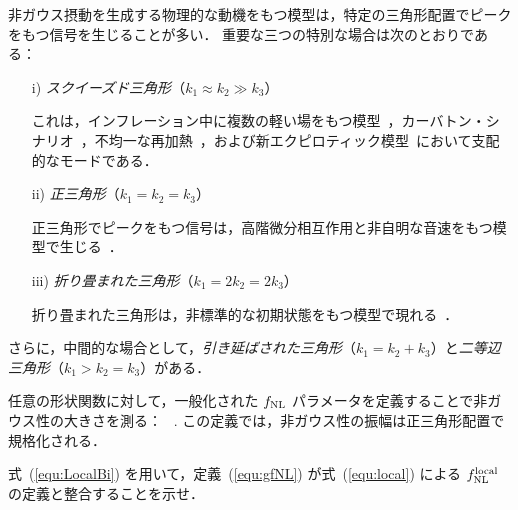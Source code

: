 非ガウス摂動を生成する物理的な動機をもつ模型は，特定の三角形配置でピークをもつ信号を生じることが多い．
重要な三つの特別な場合は次のとおりである：
\begin{enumerate}
\item[i)] {\it スクイーズド三角形}（$k_1 \approx k_2 \gg k_3$）

これは，インフレーション中に複数の軽い場をもつ模型~\cite{BMRmulti, Bernardeau:2002jy, Bernardeau:2002jf, Sasaki:2008uc, Naruko:2008sq, Byrnes:2008wi, Byrnes:2006fr, Langlois:2008vk, Valiviita:2008zb, Assadullahi:2007uw, Valiviita:2006mz, Vernizzi:2006ve, Allen:2005ye}，カーバトン・シナリオ~\cite{Linde:1996gt, Lyth_etal03}，不均一な再加熱~\cite{Dvali:2003em, Kofman:2003nx}，および新エクピロティック模型~\cite{Creminelli:2007aq,Koyama_etal07,Buchbinder_etal07, Lehners:2007wc,Lehners:2008my, Koyama:2007ag, Koyama:2007mg}において支配的なモードである．

\item[ii)] {\it 正三角形}（$k_1 = k_2 = k_3$）

正三角形でピークをもつ信号は，高階微分相互作用と非自明な音速をもつ模型で生じる~\cite{DBI, Chen:2006nt}．

\item[iii)] {\it 折り畳まれた三角形}（$k_1 = 2k_2 = 2 k_3$）

折り畳まれた三角形は，非標準的な初期状態をもつ模型で現れる~\cite{Holman:2007na, Chen:2006nt}．
\end{enumerate}

さらに，中間的な場合として，{\it 引き延ばされた三角形}（$k_1 = k_2 +k_3$）と{\it 二等辺三角形}（$k_1 > k_2 = k_3$）がある．




任意の形状関数に対して，一般化された $f_{\rm NL}$ パラメータを定義することで非ガウス性の大きさを測る：
\beq
\label{equ:gfNL}
\, .
\eeq
この定義では，非ガウス性の振幅は正三角形配置で規格化される．

\begin{thm}[$f_{\rm NL}$]
式~(\ref{equ:LocalBi}) を用いて，定義~(\ref{equ:gfNL}) が式~(\ref{equ:local}) による $f_{\rm NL}^{\rm local}$ の定義と整合することを示せ．
  \end{thm}





